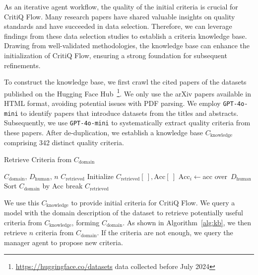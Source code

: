 As an iterative agent workflow, the quality of the initial criteria is crucial for CritiQ Flow. Many research papers have shared valuable insights on quality standards and have succeeded in data selection. Therefore, we can leverage findings from these data selection studies to establish a criteria knowledge base. Drawing from well-validated methodologies, the knowledge base can enhance the initialization of CritiQ Flow, ensuring a strong foundation for subsequent refinements.

To construct the knowledge base, we first crawl the cited papers of the datasets published on the Hugging Face
Hub~\footnote{\href{https://huggingface.co/datasets}{https://huggingface.co/datasets}
data collected before July 2024}. We
only use the arXiv papers available in HTML format, avoiding potential issues with PDF
parsing. We employ \texttt{GPT-4o-mini} to identify papers that introduce datasets
from the titles and abstracts. Subsequently, we use \texttt{GPT-4o-mini} to
systematically extract quality criteria from these papers. After de-duplication,
we establish a knowledge base $C_{\text{knowledge}}$ comprising 342 distinct
quality criteria.

\begin{algorithm}
    [htbp]
    \caption{Retrieve Criteria from $C_{\text{domain}}$}
    \label{alg:kb}
    \begin{algorithmic}
        [1]
        \renewcommand{\algorithmicrequire}{\textbf{Input:}}
        \renewcommand{\algorithmicensure}{\textbf{Output:}}
        \Require $C_{\text{domain}}$, $D_{\text{human}}$, $n$ \Ensure $C_{\text{retrieved}}$
        \State Initialize $C_{\text{retrieved}}[\ ], \text{Acc}[\ ]$
        \State $\text{Acc}_{i}\gets$acc over\ $ D_{\text{human}}$ \EndFor \State
        Sort $C_{\text{domain}}$ by $\text{Acc}$  
         \State break \EndIf {}
        \State {} \EndIf \EndFor
        \State \Return $C_{\text{retrieved}}$
    \end{algorithmic}
\end{algorithm}

We use this $C_{\text{knowledge}}$ to provide initial criteria for CritiQ Flow. We query
a model with the domain description of the dataset to retrieve potentially
useful criteria from $C_{\text{knowledge}}$, forming $C_{\text{domain}}$. As shown
in Algorithm~\ref{alg:kb}, we then retrieve $n$ criteria from $C_{\text{domain}}$.
If the criteria are not enough, we query the manager agent to propose new criteria.

